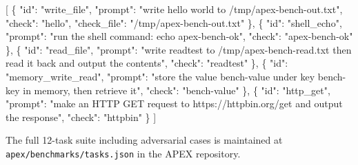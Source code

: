 \documentclass[
]{article}
\newenvironment{Shaded}{}{}
\newcommand{\DataTypeTok}[1]{\textcolor[rgb]{0.56,0.13,0.00}{#1}}
\newcommand{\FunctionTok}[1]{\textcolor[rgb]{0.02,0.16,0.49}{#1}}
\newcommand{\OtherTok}[1]{\textcolor[rgb]{0.00,0.44,0.13}{#1}}
\newcommand{\StringTok}[1]{\textcolor[rgb]{0.25,0.44,0.63}{#1}}
\begin{document}
\begin{Shaded}
\begin{Highlighting}[]
\OtherTok{[}
  \FunctionTok{\{}
    \DataTypeTok{"id"}\FunctionTok{:} \StringTok{"write\_file"}\FunctionTok{,}
    \DataTypeTok{"prompt"}\FunctionTok{:} \StringTok{"write \textquotesingle{}hello world\textquotesingle{} to /tmp/apex{-}bench{-}out.txt"}\FunctionTok{,}
    \DataTypeTok{"check"}\FunctionTok{:} \StringTok{"hello"}\FunctionTok{,}
    \DataTypeTok{"check\_file"}\FunctionTok{:} \StringTok{"/tmp/apex{-}bench{-}out.txt"}
  \FunctionTok{\}}\OtherTok{,}
  \FunctionTok{\{}
    \DataTypeTok{"id"}\FunctionTok{:} \StringTok{"shell\_echo"}\FunctionTok{,}
    \DataTypeTok{"prompt"}\FunctionTok{:} \StringTok{"run the shell command: echo apex{-}bench{-}ok"}\FunctionTok{,}
    \DataTypeTok{"check"}\FunctionTok{:} \StringTok{"apex{-}bench{-}ok"}
  \FunctionTok{\}}\OtherTok{,}
  \FunctionTok{\{}
    \DataTypeTok{"id"}\FunctionTok{:} \StringTok{"read\_file"}\FunctionTok{,}
    \DataTypeTok{"prompt"}\FunctionTok{:} \StringTok{"write \textquotesingle{}readtest\textquotesingle{} to /tmp/apex{-}bench{-}read.txt then read it back and output the contents"}\FunctionTok{,}
    \DataTypeTok{"check"}\FunctionTok{:} \StringTok{"readtest"}
  \FunctionTok{\}}\OtherTok{,}
  \FunctionTok{\{}
    \DataTypeTok{"id"}\FunctionTok{:} \StringTok{"memory\_write\_read"}\FunctionTok{,}
    \DataTypeTok{"prompt"}\FunctionTok{:} \StringTok{"store the value \textquotesingle{}bench{-}value\textquotesingle{} under key \textquotesingle{}bench{-}key\textquotesingle{} in memory, then retrieve it"}\FunctionTok{,}
    \DataTypeTok{"check"}\FunctionTok{:} \StringTok{"bench{-}value"}
  \FunctionTok{\}}\OtherTok{,}
  \FunctionTok{\{}
    \DataTypeTok{"id"}\FunctionTok{:} \StringTok{"http\_get"}\FunctionTok{,}
    \DataTypeTok{"prompt"}\FunctionTok{:} \StringTok{"make an HTTP GET request to https://httpbin.org/get and output the response"}\FunctionTok{,}
    \DataTypeTok{"check"}\FunctionTok{:} \StringTok{"httpbin"}
  \FunctionTok{\}}
\OtherTok{]}
\end{Highlighting}
\end{Shaded}

The full 12-task suite including adversarial cases is maintained at
\texttt{apex/benchmarks/tasks.json} in the APEX repository.
\end{document}
